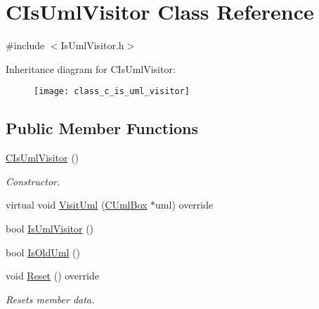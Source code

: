 \hypertarget{class_c_is_uml_visitor}{}\section{C\+Is\+Uml\+Visitor Class Reference}
\label{class_c_is_uml_visitor}


{\ttfamily \#include $<$Is\+Uml\+Visitor.\+h$>$}

Inheritance diagram for C\+Is\+Uml\+Visitor\+:\begin{figure}[H]
\begin{center}
\leavevmode
\texttt{[image: class\_c\_is\_uml\_visitor]}
\end{center}
\end{figure}
\subsection*{Public Member Functions}
\begin{DoxyCompactItemize}
\item 
\mbox{\label{class_c_is_uml_visitor_a1ae8d0ef81a5d4e6a4b7246c269ed5ee}} 
\mbox{\hyperlink{class_c_is_uml_visitor_a1ae8d0ef81a5d4e6a4b7246c269ed5ee}{C\+Is\+Uml\+Visitor}} ()
\begin{DoxyCompactList}\small\item\em Constructor. \end{DoxyCompactList}\item 
virtual void \mbox{\hyperlink{class_c_is_uml_visitor_ac49fb3a73f9949c21faf54d92d366b7c}{Visit\+Uml}} (\mbox{\hyperlink{class_c_uml_box}{C\+Uml\+Box}} $\ast$uml) override
\item 
bool \mbox{\hyperlink{class_c_is_uml_visitor_a5a4fad7fb8438c629ef0ff7ec171c721}{Is\+Uml\+Visitor}} ()
\item 
bool \mbox{\hyperlink{class_c_is_uml_visitor_a12895fb90be2171da457e2d6a524d9d2}{Is\+Old\+Uml}} ()
\item 
\mbox{\label{class_c_is_uml_visitor_a3b69c2aeb8c570797ac4bc394e032aaf}} 
void \mbox{\hyperlink{class_c_is_uml_visitor_a3b69c2aeb8c570797ac4bc394e032aaf}{Reset}} () override
\begin{DoxyCompactList}\small\item\em Resets member data. \end{DoxyCompactList}\end{DoxyCompactItemize}


